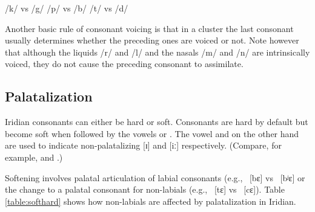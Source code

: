 \pex
\a /k/  vs /g/ 
\a /p/  vs /b/ 
\a /t/  vs /d/ 
\xe

Another basic rule of consonant voicing is that in a cluster the last consonant
usually determines whether the preceding ones are voiced or not. Note however that although the liquids /r/ and /l/ and the nasals
/m/ and /n/ are intrinsically voiced, they do not cause the preceding consonant
to assimilate.

\pex
\a{} \a{}
\a{} \a{}
\xe

\subsection{Palatalization}

Iridian consonants can either be hard or soft. Consonants are hard by default
but become soft when followed by the vowels  or . The vowel
 and  on the other hand are used to indicate non-palatalizing
[ɪ] and [iː] respectively. (Compare, for example,  and
.)

Softening involves palatal articulation of labial consonants (e.g.,
~[bɛ] vs ~[bʲɛ] or the change to a palatal consonant for
non-labials (e.g., ~[tɛ] vs ~[cɛ]). Table \ref{table:softhard}
shows how non-labials are affected by palatalization in Iridian.

